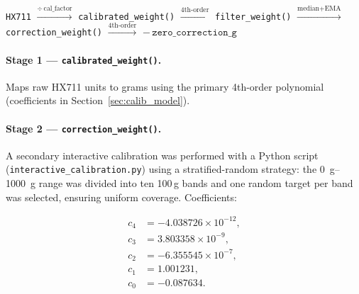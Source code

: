 \documentclass[12pt,a4paper]{article}
\begin{document}
\begin{center}
\texttt{HX711} $\xrightarrow{\div\,\text{cal\_factor}}$
\texttt{calibrated\_weight()} $\xrightarrow{\text{4th-order}}$
\texttt{filter\_weight()} $\xrightarrow{\text{median+EMA}}$
\texttt{correction\_weight()} $\xrightarrow{\text{4th-order}}$
$-\,\texttt{zero\_correction\_g}$
\end{center}

\paragraph{Stage 1 --- \texttt{calibrated\_weight()}.}
Maps raw HX711 units to grams using the primary 4th-order polynomial
(coefficients in Section~\ref{sec:calib_model}).

\paragraph{Stage 2 --- \texttt{correction\_weight()}.}
A secondary interactive calibration was performed with a Python script
(\texttt{interactive\_calibration.py}) using a stratified-random strategy: the
\SIrange{0}{1000}{g} range was divided into ten 100\,g bands and one random target
per band was selected, ensuring uniform coverage. Coefficients:

\begin{align*}
  c_4 &= -4.038726 \times 10^{-12}, \\
  c_3 &=  3.803358 \times 10^{-9},  \\
  c_2 &= -6.355545 \times 10^{-7},  \\
  c_1 &=  1.001231,                  \\
  c_0 &= -0.087634.
\end{align*}
\end{document}
